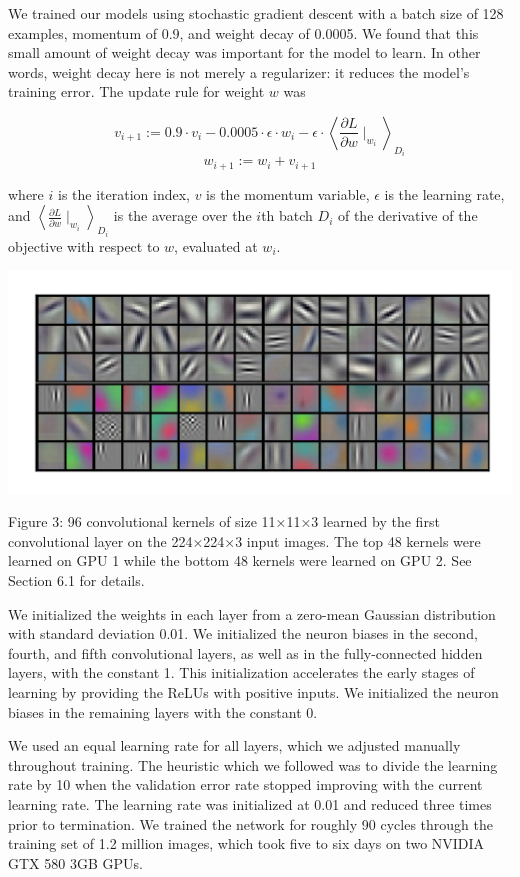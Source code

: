 \documentclass[12pt,a4paper,UTF8,twoside]{book}
\begin{document}
We trained our models using stochastic gradient descent with a batch size of 128 examples, momentum of 0.9, and weight decay of 0.0005. We found that this small amount of weight decay was important for the model to learn. In other words, weight decay here is not merely a regularizer: it reduces the model's training error. The update rule for weight \(w\) was

\[
v_{i+1} := 0.9 \cdot v_i - 0.0005 \cdot \epsilon \cdot w_i - \epsilon \cdot \left\langle \frac{\partial L}{\partial w} \mid_{w_i} \right\rangle _{D_i}
\]
\[
w_{i+1} := w_i + v_{i+1}
\]

where \(i\) is the iteration index, \(v\) is the momentum variable, \(\epsilon\) is the learning rate, and \(\left\langle \frac{\partial L}{\partial w} \mid_{w_i} \right\rangle _{D_i}\) is the average over the \(i\)th batch \(D_i\) of the derivative of the objective with respect to \(w\), evaluated at \(w_i\).

\begin{center}\includegraphics[width=0.7\linewidth]{img/01-03} \end{center}

Figure 3: 96 convolutional kernels of size 11×11×3 learned by the first convolutional layer on the 224×224×3 input images. The top 48 kernels were learned on GPU 1 while the bottom 48 kernels were learned on GPU 2. See Section 6.1 for details.

We initialized the weights in each layer from a zero-mean Gaussian distribution with standard deviation 0.01. We initialized the neuron biases in the second, fourth, and fifth convolutional layers, as well as in the fully-connected hidden layers, with the constant 1. This initialization accelerates the early stages of learning by providing the ReLUs with positive inputs. We initialized the neuron biases in the remaining layers with the constant 0.

We used an equal learning rate for all layers, which we adjusted manually throughout training. The heuristic which we followed was to divide the learning rate by 10 when the validation error rate stopped improving with the current learning rate. The learning rate was initialized at 0.01 and reduced three times prior to termination. We trained the network for roughly 90 cycles through the training set of 1.2 million images, which took five to six days on two NVIDIA GTX 580 3GB GPUs.
\end{document}
